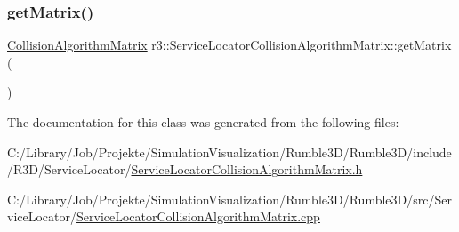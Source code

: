 \subsubsection{\texorpdfstring{get\+Matrix()}{getMatrix()}}
{\footnotesize\ttfamily \mbox{\hyperlink{classr3_1_1_collision_algorithm_matrix}{Collision\+Algorithm\+Matrix}} r3\+::\+Service\+Locator\+Collision\+Algorithm\+Matrix\+::get\+Matrix (\begin{DoxyParamCaption}{ }\end{DoxyParamCaption})\hspace{0.3cm}{\ttfamily [static]}}



The documentation for this class was generated from the following files\+:\begin{DoxyCompactItemize}
\item 
C\+:/\+Library/\+Job/\+Projekte/\+Simulation\+Visualization/\+Rumble3\+D/\+Rumble3\+D/include/\+R3\+D/\+Service\+Locator/\mbox{\hyperlink{_service_locator_collision_algorithm_matrix_8h}{Service\+Locator\+Collision\+Algorithm\+Matrix.\+h}}\item 
C\+:/\+Library/\+Job/\+Projekte/\+Simulation\+Visualization/\+Rumble3\+D/\+Rumble3\+D/src/\+Service\+Locator/\mbox{\hyperlink{_service_locator_collision_algorithm_matrix_8cpp}{Service\+Locator\+Collision\+Algorithm\+Matrix.\+cpp}}\end{DoxyCompactItemize}
